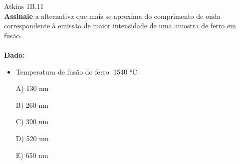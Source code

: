 \begin{problem}[answer=A]
    Atkins 1B.11\\
\textbf{Assinale} a alternativa que mais se aproxima do comprimento de onda correspondente à emissão de maior intensidade de uma amostra de ferro em fusão.\\
\\
\textbf{Dado:}
\begin{itemize}
    \item Temperatura de fusão do ferro: 1540 °C
\end{itemize}
\begin{itemize}
    \item [A)] 130 nm
    \item [B)] 260 nm
    \item [C)] 390 nm
    \item [D)] 520 nm
    \item [E)] 650 nm
\end{itemize}


\end{problem}
